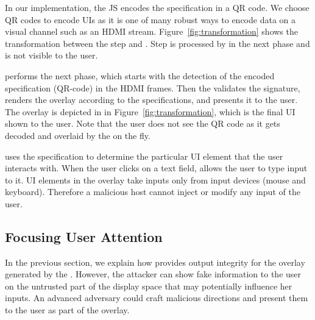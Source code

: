 In our implementation, the \name JS encodes the specification in a QR code. We choose QR codes to encode UIs as it is one of many robust ways to encode data on a visual channel such as an HDMI stream. Figure~\ref{fig:transformation} shows the transformation between the step \one and \two. Step \two is processed by \device in the next phase and is not visible to the user.




 \device performs the next phase, which starts with the detection of the encoded specification (QR-code) in the HDMI frames. Then the \device validates the signature, renders the overlay according to the specifications, and presents it to the user.  The \device overlay is depicted in \three in Figure~\ref{fig:transformation}, which is the final UI shown to the user. Note that the user does not see the QR code as it gets decoded and overlaid by the \device on the fly.

\device uses the specification to determine the particular UI element that the user interacts with. When the user clicks on a text field, \device allows the user to type input to it. UI elements in the overlay take inputs only from input devices (mouse and keyboard). Therefore a malicious host cannot inject or modify any input of the user.

\subsection{Focusing User Attention}
\label{sec:systemDesign:userAttention}

In the previous section, we explain how \name provides output integrity for the overlay generated by the \device. However, the attacker can show fake information to the user on the untrusted part of the display space that may potentially influence her inputs. An advanced adversary could craft malicious directions and present them to the user as part of the overlay.

